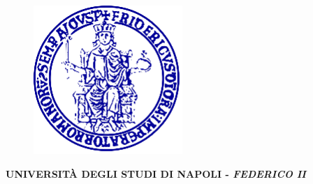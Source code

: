 \documentclass[11pt,oneside]{amsart}
\begin{document}
\begin{titlepage}
\begin{center}
\begin{figure}[htpb]
    \begin{center}
    \includegraphics[scale=1.5]{unina.png}
    \end{center}
\end{figure}
%
\vspace{-.5 cm}

\textbf{{\LARGE U}{\Large NIVERSIT\`A}  {\LARGE D}{\Large EGLI}  {\LARGE S}{\Large TUDI}  {\LARGE D}{\Large I}  {\LARGE N}{\Large APOLI} -  \textit{{\LARGE F}{\Large EDERICO II}}}


\end{center}
\end{titlepage}
\end{document}
